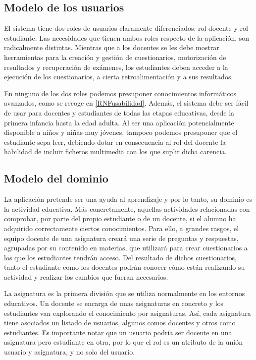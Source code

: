 \subsection{Modelo de los usuarios}


El sistema tiene dos roles de usuarios claramente diferenciados: rol docente y rol estudiante. Las necesidades que tienen ambos roles respecto de la aplicación, son radicalmente distintas. Mientras que a los docentes se les debe mostrar herramientas para la creación y gestión de cuestionarios, motorización de resultados y recuperación de exámenes, los estudiantes deben acceder a la ejecución de los cuestionarios, a cierta retroalimentación y a sus resultados.

En ninguno de los dos roles podemos presuponer conocimientos informáticos avanzados, como se recoge en \ref{RNFusabilidad}. Además, el sistema debe ser fácil de usar para docentes y estudiantes de todas las etapas educativas, desde la primera infancia hasta la edad adulta. Al ser una aplicación potencialmente disponible a niños y niñas muy jóvenes, tampoco podemos presuponer que el estudiante sepa leer, debiendo dotar en consecuencia al rol del docente la habilidad de incluir ficheros multimedia con los que suplir dicha carencia.

\subsection{Modelo del dominio}

La aplicación pretende ser una ayuda al aprendizaje y por lo tanto, su dominio es la actividad educativa. Más concretamente, aquellas actividades relacionadas con comprobar, por parte del propio estudiante o de un docente, si el alumno ha adquirido correctamente ciertos conocimientos. Para ello, a grandes rasgos, el equipo docente de una asignatura creará una serie de preguntas y respuestas, agrupadas por su contenido en materias, que utilizará para crear cuestionarios a los que los estudiantes tendrán acceso. Del resultado de dichos cuestionarios, tanto el estudiante como los docentes podrán conocer cómo están realizando su actividad y realizar los cambios que fueran necesarios.

La asignatura es la primera división que se utiliza normalmente en los entornos educativos. Un docente se encarga de unas asignaturas en concreto y los estudiantes van explorando el conocimiento por asignaturas. Así, cada asignatura tiene asociados un listado de usuarios, algunos comos docentes y otros como estudiantes. Es importante notar que un usuario podría ser docente en una asignatura pero estudiante en otra, por lo que el rol es un atributo de la unión usuario y asignatura, y no solo del usuario.

